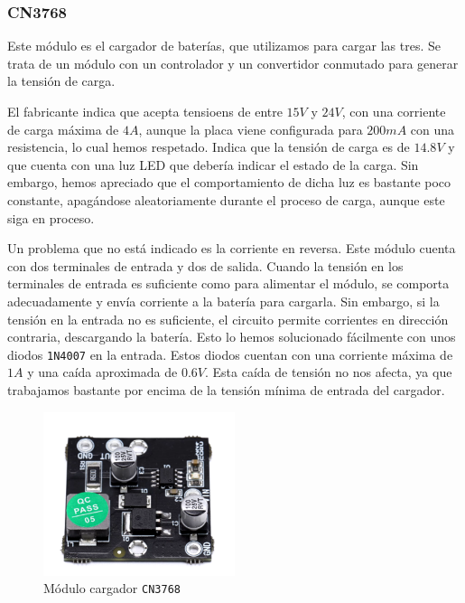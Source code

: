 \subsubsection{CN3768}

Este módulo es el cargador de baterías, que utilizamos para cargar las tres. Se trata de un módulo con un controlador y un convertidor conmutado para generar la tensión de carga. 

El fabricante indica que acepta tensioens de entre $15 V$ y $24 V$, con una corriente de carga máxima de $4 A$, aunque la placa viene configurada para $200 mA$ con una resistencia, lo cual hemos respetado. Indica que la tensión de carga es de $14.8 V$ y que cuenta con una luz LED que debería indicar el estado de la carga. Sin embargo, hemos apreciado que el comportamiento de dicha luz es bastante poco constante, apagándose aleatoriamente durante el proceso de carga, aunque este siga en proceso. \cite{consonanceCN3768}

Un problema que no está indicado es la corriente en reversa. Este módulo cuenta con dos terminales de entrada y dos de salida. Cuando la tensión en los terminales de entrada es suficiente como para alimentar el módulo, se comporta adecuadamente y envía corriente a la batería para cargarla. Sin embargo, si la tensión en la entrada no es suficiente, el circuito permite corrientes en dirección contraria, descargando la batería. Esto lo hemos solucionado fácilmente con unos diodos \texttt{1N4007} en la entrada. Estos diodos cuentan con una corriente máxima de $1 A$ y una caída aproximada de $0.6 V$. Esta caída de tensión no nos afecta, ya que trabajamos bastante por encima de la tensión mínima de entrada del cargador.

\begin{figure}[H]
    \centering
    \includegraphics[width=0.5\textwidth]{images/2-hardware/componentes/CN3768.png}
    \caption{Módulo cargador \texttt{CN3768}}
    \label{fig:hardware/modulos/cn3768}
\end{figure}